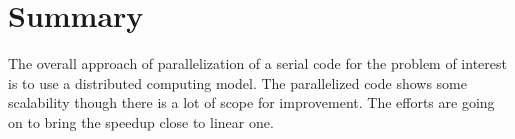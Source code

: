 \documentclass[a4paper, 11pt, oneside]{scrartcl}
\begin{document}
\section{Summary}
The overall approach of parallelization of a serial code for the problem of interest is to use a distributed computing model. The parallelized code shows some scalability though there is a lot of scope for improvement. The efforts are going on to bring the speedup close to linear one.



\end{document}
